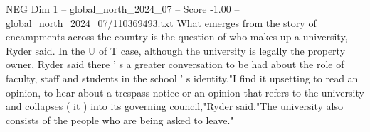 \begin{textsample}{NEG Dim 1 – global\_north\_2024\_07 – Score -1.00 – global\_north\_2024\_07/110369493.txt}
What emerges from the story of encampments across the country is the question of who makes up a university, Ryder said.
In the U of T case, although the university is legally the property owner, Ryder said there ' s a greater conversation to be had about the role of faculty, staff and students in the school ' s identity."I find it upsetting to read an opinion, to hear about a trespass notice or an opinion that refers to the university and collapses ( it ) into its governing council,"Ryder said."The university also consists of the people who are being asked to leave."

\end{textsample}
